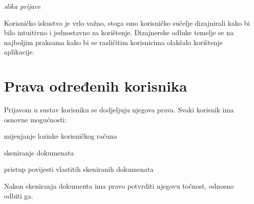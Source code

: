 		\textit{slika prijave}
		
		Korisničko iskustvo je vrlo važno, stoga smo korisničko sučelje dizajnirali kako bi bilo intuitivno i jednostavno za korištenje. Dizajnerske odluke temelje se na najboljim praksama kako bi se različitim korisnicima olakšalo korištenje aplikacije.
		
		\section{Prava određenih korisnika}

		Prijavom u sustav korisniku se dodjeljuju njegova prava. Svaki korisnik ima osnovne mogućnosti:
		\begin{packed_item}
			\item mijenjanje lozinke korisničkog računa
			\item skeniranje dokumenata
			\item pristup povijesti vlastitih skeniranih dokumenata
			\item Nakon skeniranja dokumenta ima pravo potvrditi njegovu točnost, odnosno odbiti ga.
		\end{packed_item}
		

